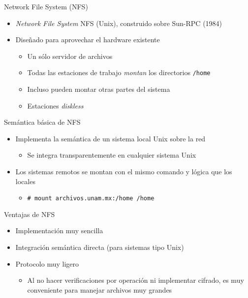 \documentclass[presentation]{beamer}
\begin{document}
\begin{frame}[label={sec:orgb2bf545},fragile]{Network File System (NFS)}
 \begin{itemize}
\item \emph{Network File System} NFS (Unix), construido sobre Sun-RPC (1984)
\item Diseñado para aprovechar el hardware existente
\begin{itemize}
\item Un sólo servidor de archivos
\item Todas las estaciones de trabajo \emph{montan} los directorios \texttt{/home}
\item Incluso pueden montar otras partes del sistema
\item Estaciones \emph{diskless}
\end{itemize}
\end{itemize}
\end{frame}

\begin{frame}[label={sec:org8d937a8},fragile]{Semántica básica de NFS}
 \begin{itemize}
\item Implementa la semántica de un sistema local Unix sobre la red
\begin{itemize}
\item Se integra transparentemente en cualquier sistema Unix
\end{itemize}
\item Los sistemas remotos se montan con el mismo comando y lógica que
los locales
\begin{itemize}
\item \texttt{\# mount archivos.unam.mx:/home /home}
\end{itemize}
\end{itemize}
\end{frame}

\begin{frame}[label={sec:org7a756be}]{Ventajas de NFS}
\begin{itemize}
\item Implementación muy sencilla
\item Integración semántica directa (para sistemas tipo Unix)
\item Protocolo muy ligero
\begin{itemize}
\item Al no hacer verificaciones por operación ni implementar cifrado,
es muy conveniente para manejar archivos muy grandes
\end{itemize}
\end{itemize}
\end{frame}
\end{document}
